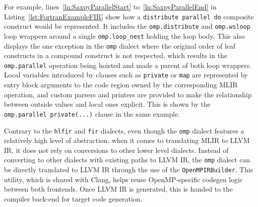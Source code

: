 \documentclass[acmtog,natbib=false]{acmart}
\newcommand{\code}[1]{\texttt{#1}\xspace}
\begin{document}
For example, lines~\ref{ln:SaxpyParallelStart} to~\ref{ln:SaxpyParallelEnd} in Listing~\ref{lst:FortranExampleFIR} show how a \code{distribute parallel do} composite construct would be represented.
It includes the \code{omp.distribute} and \code{omp.wsloop} loop wrappers around a single \code{omp.loop\_nest} holding the loop body.
This also displays the one exception in the \code{omp} dialect where the original order of leaf constructs in a compound construct is not respected, which results in the \code{omp.parallel} operation being hoisted and made a parent of both loop wrappers.
Local variables introduced by clauses such as \code{private} or \code{map} are represented by entry block arguments to the code region owned by the corresponding \ac{MLIR} operation, and custom parsers and printers are provided to make the relationship between outside values and local ones explicit.
This is shown by the \code{omp.parallel private(...)} clause in the same example.

Contrary to the \code{hlfir} and \code{fir} dialects, even though the \code{omp} dialect features a relatively high level of abstraction, when it comes to translating \ac{MLIR} to LLVM \ac{IR}, it does not rely on conversions to other lower level dialects.
Instead of converting to other dialects with existing paths to LLVM \ac{IR}, the \code{omp} dialect can be directly translated to LLVM \ac{IR} through the use of the \code{OpenMPIRBuilder}.
This utility, which is shared with Clang, helps reuse OpenMP-specific codegen logic between both frontends.
Once LLVM \ac{IR} is generated, this is handed to the compiler back-end for target code generation.


\end{document}
